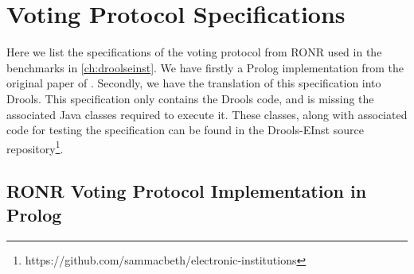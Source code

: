
\chapter{Voting Protocol Specifications}

Here we list the specifications of the voting protocol from \ac{RONR} used in
the benchmarks in \autoref{ch:droolseinst}. We have firstly a Prolog
implementation from the original paper of \citet{Pitt2005a}. Secondly, we have
the translation of this specification into Drools. This specification only
contains the Drools code, and is missing the associated Java classes required
to execute it. These classes, along with associated code for testing the
specification can be found in the Drools-EInst source
repository\footnote{https://github.com/sammacbeth/electronic-institutions}.

\section{RONR Voting Protocol Implementation in Prolog}\label{sec:ronrcode}

